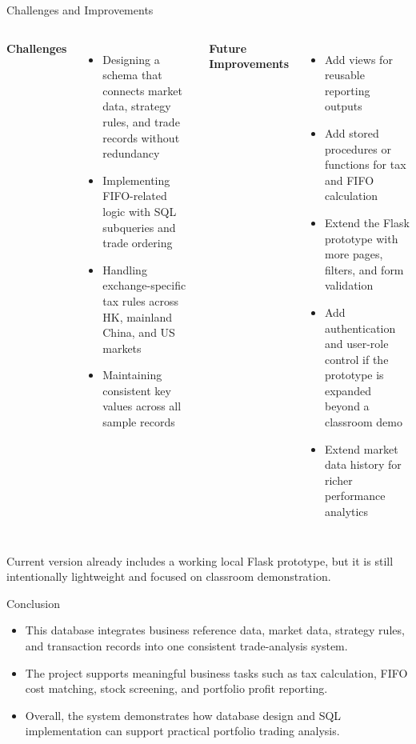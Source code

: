 \documentclass[aspectratio=169]{beamer}
\begin{document}
\begin{frame}{Challenges and Improvements}
\begin{columns}[T,onlytextwidth]
    \textbf{Challenges}
    \begin{itemize}
        \item Designing a schema that connects market data, strategy rules, and trade records without redundancy
        \item Implementing FIFO-related logic with SQL subqueries and trade ordering
        \item Handling exchange-specific tax rules across HK, mainland China, and US markets
        \item Maintaining consistent key values across all sample records
    \end{itemize}
    \textbf{Future Improvements}
    \begin{itemize}
        \item Add views for reusable reporting outputs
        \item Add stored procedures or functions for tax and FIFO calculation
        \item Extend the Flask prototype with more pages, filters, and form validation
        \item Add authentication and user-role control if the prototype is expanded beyond a classroom demo
        \item Extend market data history for richer performance analytics
    \end{itemize}
\end{columns}
\vspace{0.4em}
\small Current version already includes a working local Flask prototype, but it is still intentionally lightweight and focused on classroom demonstration.
\end{frame}

\begin{frame}{Conclusion}
\begin{itemize}
    \item This database integrates business reference data, market data, strategy rules, and transaction records into one consistent trade-analysis system.
    \item The project supports meaningful business tasks such as tax calculation, FIFO cost matching, stock screening, and portfolio profit reporting.
    \item Overall, the system demonstrates how database design and SQL implementation can support practical portfolio trading analysis.
\end{itemize}
\end{frame}
\end{document}
